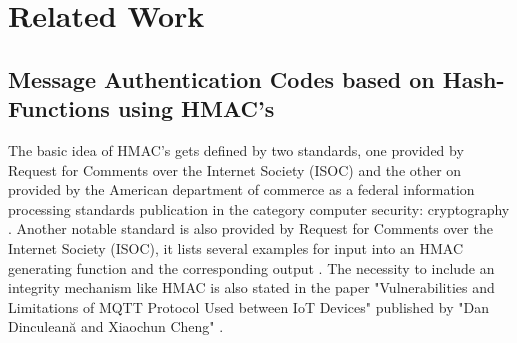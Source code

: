 \section{Related Work}

\subsection{Message Authentication Codes based on Hash-Functions using HMAC's}

The basic idea of HMAC’s gets defined by two standards, one provided by Request for Comments over the Internet Society (ISOC) \cite{RFC} and the other on provided by the American department of commerce as a federal information processing standards publication in the category computer security: cryptography \cite{FIBS}. Another notable standard is also provided by Request for Comments over the Internet Society (ISOC), it lists several examples for input into an HMAC generating function and the corresponding output \cite{RFC2}. The necessity to include an integrity mechanism like HMAC is also stated in the paper "Vulnerabilities and Limitations of MQTT Protocol
Used between IoT Devices" published by "Dan Dinculeană and Xiaochun Cheng" \cite{LIMI}.